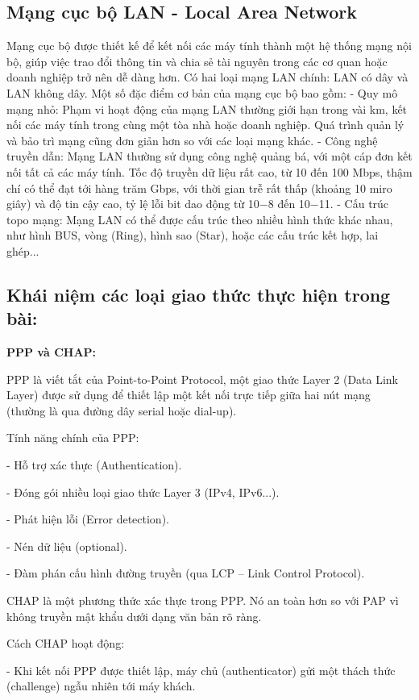 \documentclass[13pt]{article}
\begin{document}
\subsection{Mạng cục bộ LAN - Local Area Network}

Mạng cục bộ được thiết kế để kết nối các máy tính thành một hệ thống mạng nội bộ, giúp việc trao đổi thông tin và chia sẻ tài nguyên trong các cơ quan hoặc doanh nghiệp trở nên dễ dàng hơn. Có hai loại mạng
LAN chính: LAN có dây và LAN không dây. Một số đặc điểm cơ bản của mạng cục bộ bao gồm:
- Quy mô mạng nhỏ: Phạm vi hoạt động của mạng LAN thường giới hạn trong vài km, kết nối các máy
tính trong cùng một tòa nhà hoặc doanh nghiệp. Quá trình quản lý và bảo trì mạng cũng đơn giản hơn so
với các loại mạng khác.
- Công nghệ truyền dẫn: Mạng LAN thường sử dụng công nghệ quảng bá, với một cáp đơn kết nối tất cả
các máy tính. Tốc độ truyền dữ liệu rất cao, từ 10 đến 100 Mbps, thậm chí có thể đạt tới hàng trăm Gbps,
với thời gian trễ rất thấp (khoảng 10 miro giây) và độ tin cậy cao, tỷ lệ lỗi bit dao động từ 10−8 đến 10−11.
- Cấu trúc topo mạng: Mạng LAN có thể được cấu trúc theo nhiều hình thức khác nhau, như hình BUS,
vòng (Ring), hình sao (Star), hoặc các cấu trúc kết hợp, lai ghép...
          

        \subsection{Khái niệm các loại giao thức thực hiện trong bài:}

\textbf{PPP và CHAP:}

PPP là viết tắt của Point-to-Point Protocol, một giao thức Layer 2 (Data Link Layer) được sử dụng để thiết lập một kết nối trực tiếp giữa hai nút mạng (thường là qua đường dây serial hoặc dial-up).

Tính năng chính của PPP:

- Hỗ trợ xác thực (Authentication).

- Đóng gói nhiều loại giao thức Layer 3 (IPv4, IPv6...).

- Phát hiện lỗi (Error detection).

- Nén dữ liệu (optional).

- Đàm phán cấu hình đường truyền (qua LCP – Link Control Protocol).

CHAP là một phương thức xác thực trong PPP. Nó an toàn hơn so với PAP vì không truyền mật khẩu dưới dạng văn bản rõ ràng.

Cách CHAP hoạt động:

- Khi kết nối PPP được thiết lập, máy chủ (authenticator) gửi một thách thức (challenge) ngẫu nhiên tới máy khách.
\end{document}
